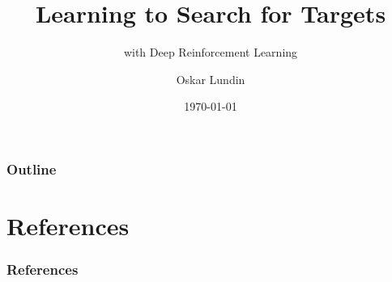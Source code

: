 \documentclass[\comment{handout},aspectratio=169]{beamer}
\title{Learning to Search for Targets}
\subtitle{with Deep Reinforcement Learning}
\author{Oskar Lundin}
\institute{Linköping University}
\date{\today}
\begin{document}
\begin{frame}
    \titlepage
\end{frame}

\begin{frame}
    \frametitle{Outline}
    \tableofcontents
\end{frame}







\section*{References}

\begin{frame}
    \frametitle{References}
    
    
\end{frame}

\appendix


\end{document}
